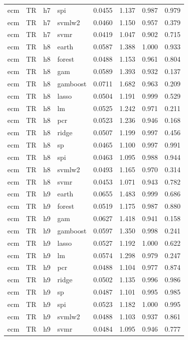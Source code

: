 \begin{ThreePartTable}
\begin{longtable}[t]{llclcccc}
ecm & TR & h7 & spi & 0.0455 & 1.137 & 0.987 & 0.979\\
ecm & TR & h7 & svmlw2 & 0.0460 & 1.150 & 0.957 & 0.379\\
ecm & TR & h7 & svmr & 0.0419 & 1.047 & 0.902 & 0.715\\
\addlinespace
ecm & TR & h8 & earth & 0.0587 & 1.388 & 1.000 & 0.933\\
ecm & TR & h8 & forest & 0.0488 & 1.153 & 0.961 & 0.804\\
ecm & TR & h8 & gam & 0.0589 & 1.393 & 0.932 & 0.137\\
ecm & TR & h8 & gamboost & 0.0711 & 1.682 & 0.963 & 0.209\\
ecm & TR & h8 & lasso & 0.0504 & 1.191 & 0.999 & 0.529\\
ecm & TR & h8 & lm & 0.0525 & 1.242 & 0.971 & 0.211\\
ecm & TR & h8 & pcr & 0.0523 & 1.236 & 0.946 & 0.168\\
ecm & TR & h8 & ridge & 0.0507 & 1.199 & 0.997 & 0.456\\
ecm & TR & h8 & sp & 0.0465 & 1.100 & 0.997 & 0.991\\
ecm & TR & h8 & spi & 0.0463 & 1.095 & 0.988 & 0.944\\
ecm & TR & h8 & svmlw2 & 0.0493 & 1.165 & 0.970 & 0.314\\
ecm & TR & h8 & svmr & 0.0453 & 1.071 & 0.943 & 0.782\\
\addlinespace
ecm & TR & h9 & earth & 0.0655 & 1.483 & 0.999 & 0.686\\
ecm & TR & h9 & forest & 0.0519 & 1.175 & 0.987 & 0.880\\
ecm & TR & h9 & gam & 0.0627 & 1.418 & 0.941 & 0.158\\
ecm & TR & h9 & gamboost & 0.0597 & 1.350 & 0.998 & 0.241\\
ecm & TR & h9 & lasso & 0.0527 & 1.192 & 1.000 & 0.622\\
ecm & TR & h9 & lm & 0.0574 & 1.298 & 0.979 & 0.247\\
ecm & TR & h9 & pcr & 0.0488 & 1.104 & 0.977 & 0.874\\
ecm & TR & h9 & ridge & 0.0502 & 1.135 & 0.996 & 0.986\\
ecm & TR & h9 & sp & 0.0487 & 1.101 & 0.995 & 0.985\\
ecm & TR & h9 & spi & 0.0523 & 1.182 & 1.000 & 0.995\\
ecm & TR & h9 & svmlw2 & 0.0488 & 1.103 & 0.937 & 0.861\\
ecm & TR & h9 & svmr & 0.0484 & 1.095 & 0.946 & 0.777\\

\end{longtable}
\end{ThreePartTable}
